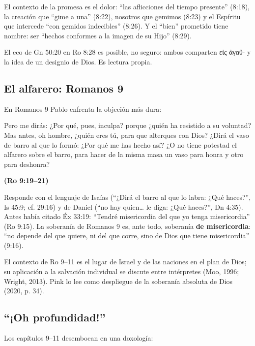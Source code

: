 \documentclass[11pt,letterpaper]{article}
\newcommand{\grc}[1]{\foreignlanguage{ancientgreek}{#1}}
\newcommand{\fuente}[1]{\par\hfill{\upshape\bfseries\small\textcolor{azul}{#1}}}
\newcommand{\destacar}[1]{\textbf{\textcolor{azul}{#1}}}
\begin{document}
El contexto de la promesa es el dolor: ``las aflicciones del tiempo presente'' (8:18), la creación que ``gime a una'' (8:22), nosotros que gemimos (8:23) y el Espíritu que intercede ``con gemidos indecibles'' (8:26). Y el ``bien'' prometido tiene nombre: ser ``hechos conformes a la imagen de su Hijo'' (8:29).

\begin{nota}[Precisión]
El eco de Gn 50:20 en Ro 8:28 es posible, no seguro: ambos comparten \grc{εἰς ἀγαθ-} y la idea de un designio de Dios. Es lectura propia.
\end{nota}

\subsection{El alfarero: Romanos 9}
En Romanos 9 Pablo enfrenta la objeción más dura:

\begin{cita}Pero me dirás: ¿Por qué, pues, inculpa? porque ¿quién ha resistido a su voluntad? Mas antes, oh hombre, ¿quién eres tú, para que alterques con Dios? ¿Dirá el vaso de barro al que lo formó: ¿Por qué me has hecho así? ¿O no tiene potestad el alfarero sobre el barro, para hacer de la misma masa un vaso para honra y otro para deshonra?\fuente{(Ro 9:19--21)}\end{cita}

Responde con el lenguaje de Isaías (``¿Dirá el barro al que lo labra: ¿Qué haces?'', Is 45:9; cf. 29:16) y de Daniel (``no hay quien\ldots{} le diga: ¿Qué haces?'', Dn 4:35). Antes había citado Éx 33:19: ``Tendré misericordia del que yo tenga misericordia'' (Ro 9:15). La soberanía de Romanos 9 es, ante todo, soberanía \destacar{de misericordia}: ``no depende del que quiere, ni del que corre, sino de Dios que tiene misericordia'' (9:16).

\begin{nota}[Precisión]
El contexto de Ro 9--11 es el lugar de Israel y de las naciones en el plan de Dios; su aplicación a la salvación individual se discute entre intérpretes (Moo, 1996; Wright, 2013). Pink lo lee como despliegue de la soberanía absoluta de Dios (2020, p. 34).
\end{nota}

\subsection{``¡Oh profundidad!''}
Los capítulos 9--11 desembocan en una doxología:
\end{document}
